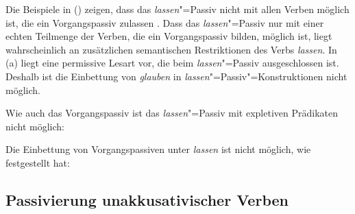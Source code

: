 %
%
Die Beispiele in () zeigen, dass das \emph{lassen}"=Passiv nicht mit allen Verben möglich ist,
die ein Vorgangspassiv zulassen \citep[]{Reis76c}.
Dass das \emph{lassen}"=Passiv nur mit einer echten Teilmenge der Verben, die ein Vorgangspassiv bilden,
möglich ist, liegt wahrscheinlich an zusätzlichen semantischen Restriktionen des Verbs \emph{lassen}.
\eal
{}
\zl
In (a) liegt eine permissive Lesart vor, die beim \emph{lassen}"=Passiv ausgeschlossen ist.
Deshalb ist die Einbettung von \emph{glauben} in \emph{lassen}"=Passiv"=Konstruktionen nicht möglich.
\eal
{}
\zl

\noindent
Wie auch das Vorgangspassiv ist das \emph{lassen}"=Passiv mit expletiven Prädikaten nicht möglich:
\z

\noindent
Die Einbettung von Vorgangspassiven unter \emph{lassen} ist nicht möglich,
wie \citet[]{Wilder90a} festgestellt hat:
\eal
{}
\zl
%


\subsection{Passivierung unakkusativischer Verben}
\label{sec-Passiv-unakkusativ}

